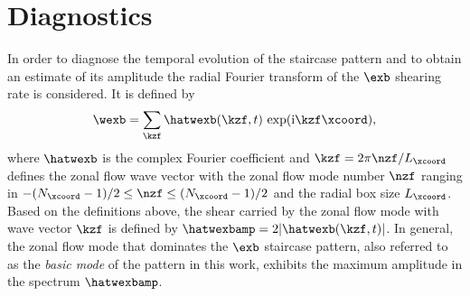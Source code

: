 \newpage
\section{Diagnostics}
\label{sec:diagnostics}

In order to diagnose the temporal evolution of the staircase pattern and to obtain an estimate of its amplitude the radial Fourier transform of the $\exb$ shearing rate is considered. 
It is defined by
\begin{equation}
	\wexb = \sum_{\kzf} \hatwexb(\kzf,t) \, \exp(\mathrm{i} \kzf \xcoord),
	\label{eq:shearingrate_fourier}
\end{equation}
where $\hatwexb$ is the complex Fourier coefficient and \linebreak $\kzf = 2\pi \nzf/L_\xcoord$
defines the zonal flow wave vector with the zonal flow mode number $\nzf$ ranging in $-(N_\xcoord -1)/2 \leq \nzf \leq (N_\xcoord -1)/2 $ and the radial box size $L_\xcoord$.
Based on the definitions above, the shear carried by the zonal flow mode with wave vector $\kzf$ is defined by $\hatwexbamp = 2 |\hatwexb(\kzf,t)|$. 
In general, the zonal flow mode that dominates the $\exb$ staircase pattern, also referred to as the \textit{basic mode} of the pattern in this work, exhibits the maximum amplitude in the spectrum $\hatwexbamp$.\\